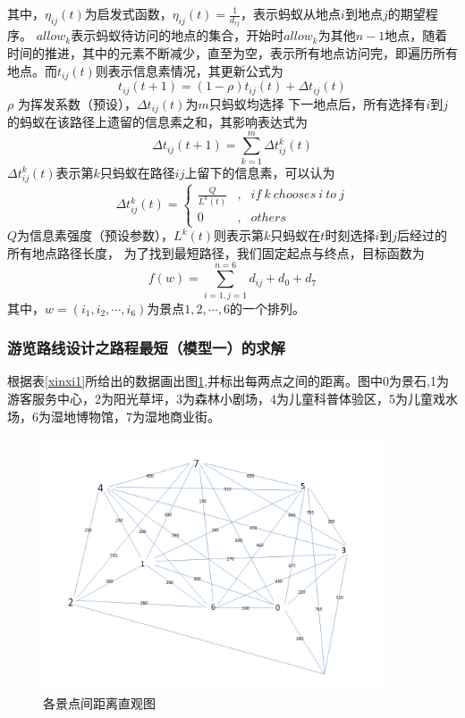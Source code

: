 \documentclass[hyperref,UTF8]{article}
\begin{document}
{其中，${\eta}_{ij}(t)$为启发式函数，${\eta}_{ij}(t)=\frac{1}{d_{ij}}$，表示蚂蚁从地点$i$到地点$j$的期望程序。
$allow_k$表示蚂蚁待访问的地点的集合，开始时$allow_k$为其他$n-1$地点，随着时间的推进，其中的元素不断减少，直至为空，表示所有地点访问完，即遍历所有地点。而$t_{ij}(t)$则表示信息素情况，其更新公式为
\begin{equation}\label{gongshi3}
t_{ij}(t+1)=(1-\rho)t_{ij}(t)+\Delta t_{ij}(t)
\end{equation}
$\rho$ 为挥发系数（预设），$\Delta t_{ij}(t)$为$m$只蚂蚁均选择
下一地点后，所有选择有$i$到$j$的蚂蚁在该路径上遗留的信息素之和，其影响表达式为
\begin{equation}\label{gongshi4}
\Delta t_{ij}(t+1)=\sum_{k=1}^{m}\Delta t_{ij}^k(t)
\end{equation}
$\Delta t_{ij}^k(t)$表示第$k$只蚂蚁在路径$ij$上留下的信息素，可以认为
\begin{equation}\label{gongshi5}
\Delta t_{ij}^k(t)=\left\{
\begin{array}{ccc}
 {\frac{Q}{L^k(t)}} & , & {if\ k\ chooses\ i\ to\ j} \\
0 & , & others
\end{array} \right.
\end{equation}
$Q$为信息素强度（预设参数），$L^k(t)$则表示第$k$只蚂蚁在$t$时刻选择$i$到$j$后经过的所有地点路径长度，
为了找到最短路径，我们固定起点与终点，目标函数为
\begin{equation}\label{gongshi2}
f(w)=\sum_{i=1,j=1}^{n=6}d_{ij}+d_{0}+d_{7}
\end{equation}
其中，$w=(i_1,i_2,\cdots,i_6)$为景点$1,2,\cdots,6$的一个排列。
\subsubsection{游览路线设计之路程最短（模型一）的求解}
根据表\ref{xinxi1}所给出的数据画出图\ref{tu1},并标出每两点之间的距离。图中0为景石,1为游客服务中心，2为阳光草坪，3为森林小剧场，4为儿童科普体验区，5为儿童戏水场，6为湿地博物馆，7为湿地商业街。
\begin{figure}[htbp]
\centering
\includegraphics[width = 10cm]{20180501195944.png}
\caption{各景点间距离直观图}
\label{tu1}
\end{figure}

}
\end{document}
